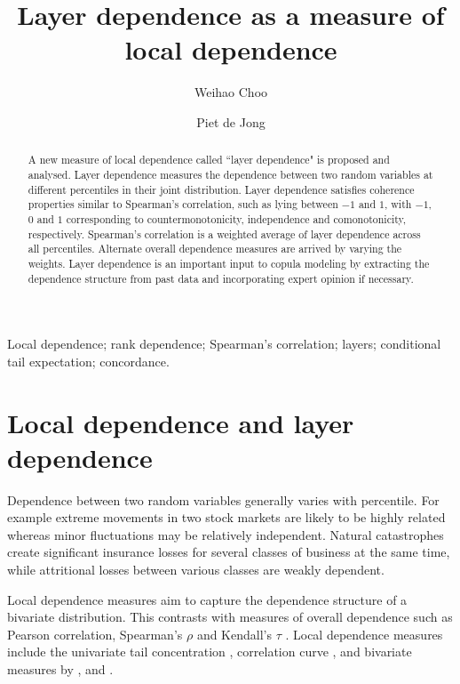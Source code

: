 \documentclass[authoryear]{elsarticle}
\begin{document}
\begin{frontmatter}

\title{Layer dependence as a measure of local dependence}
\author[acst]{Weihao Choo}
\author[acst]{Piet de Jong}



\address[acst]{Department of Applied Finance and Actuarial Studies Macquarie
University, NSW 2109, Australia.}




\begin{abstract}
A new measure of local dependence called  ``layer dependence" is proposed and analysed. Layer dependence measures the dependence between two random variables at different percentiles in their joint distribution. Layer dependence satisfies coherence properties similar to Spearman's correlation, such as lying between $-1$ and $1$, with $-1$, $0$ and $1$ corresponding to countermonotonicity, independence and comonotonicity, respectively. Spearman's correlation is  a weighted average of layer dependence across all percentiles.  Alternate overall dependence measures are arrived by varying the weights. Layer dependence is an important input to copula modeling by extracting the dependence structure from past data and incorporating expert opinion if necessary.
\end{abstract}

\begin{keyword}
Local dependence; rank dependence; Spearman's correlation; layers; conditional tail expectation; concordance.
\end{keyword}



\end{frontmatter}


\section{Local dependence and layer dependence}\label{sreview}


Dependence between two random variables generally varies with percentile. For example extreme movements in two stock markets are likely to be highly related  whereas minor fluctuations may be relatively independent. Natural catastrophes create significant insurance losses for several classes of business at the same time, while attritional losses between various classes are weakly dependent.


Local dependence measures aim to capture the dependence structure of a bivariate distribution. This contrasts with  measures of overall dependence such as Pearson correlation, Spearman's $\rho$ and Kendall's $\tau$ \citep{embrechts2002correlation}. Local dependence measures include the univariate tail concentration \citep{venter2002tails}, correlation curve \citep{bjerve1993correlation}, and bivariate measures by \cite{bairamov2003new}, \cite{jones1996local} and \cite{holland1987dependence}.
\end{document}
